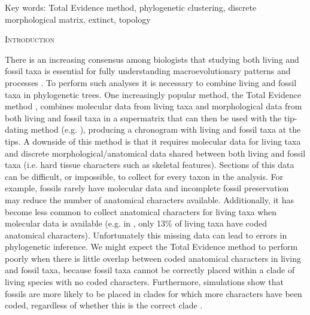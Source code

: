 \documentclass[12pt,letterpaper]{article}
\renewcommand{\section}[1]{%
\bigskip
\begin{center}
\begin{Large}
\normalfont\scshape #1
\medskip
\end{Large}
\end{center}}
\begin{document}
\noindent Key words: Total Evidence method, phylogenetic clustering, discrete morphological matrix, extinct, topology\\

\vspace{1.5in}

%
%
\newpage 
\section{Introduction}
There is an increasing consensus among biologists that studying both living and fossil taxa is essential for fully understanding macroevolutionary patterns and processes \cite{slaterunifying2013,fritzdiversity2013}.
To perform such analyses it is necessary to combine living and fossil taxa in phylogenetic trees.
One increasingly popular method, the Total Evidence method \cite{ronquista2012}, combines molecular data from living taxa and morphological data from both living and fossil taxa in a supermatrix that can then be used with the tip-dating method (e.g. \cite{pyrondivergence2011,ronquista2012,schragocombining2013,slaterunifying2013,beckancient2014}), producing a chronogram with living and fossil taxa at the tips.
A downside of this method is that it requires molecular data for living taxa and discrete morphological/anatomical data shared between both living and fossil taxa (i.e. hard tissue characters such as skeletal features).
Sections of this data can be difficult, or impossible, to collect for every taxon in the analysis.
For example, fossils rarely have molecular data and incomplete fossil preservation may reduce the number of anatomical characters available.
Additionally, it has become less common to collect anatomical characters for living taxa when molecular data is available (e.g. in \cite{slaterphylogenetic2013}, only 13\% of living taxa have coded anatomical characters).
Unfortunately this missing data can lead to errors in phylogenetic inference.
We might expect the Total Evidence method to perform poorly when there is little overlap between coded anatomical characters in living and fossil taxa, because fossil taxa cannot be correctly placed within a clade of living species with no coded characters.
Furthermore, simulations show that fossils are more likely to be placed in clades for which more characters have been coded, regardless of whether this is the correct clade \cite{GuillermeCooper}.
\end{document}
